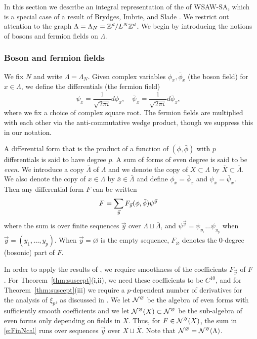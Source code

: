 In this section we describe an integral representation of the of WSAW-SA, which
is a special case of a result of Brydges, Imbrie, and Slade \cite{BIS09}.
We restrict out attention to the graph $\Lambda = \Lambda_N = { {{\mathbb Z}}^d }/L^N{ {{\mathbb Z}}^d }$.
We begin by introducing the notions of bosons and fermion fields on $\Lambda$.

\subsubsection{Boson and fermion fields}
\label{sec:forms}

We fix $N$ and write $\Lambda = \Lambda_N$.
Given complex variables $\phi_x, \bar\phi_x$
(the boson field) for $x \in \Lambda$,
we define the differentials (the fermion field)
\begin{equation}
\psi_x = \frac{1}{\sqrt{2\pi i}} d\phi_x,
\quad
\bar\psi_x = \frac{1}{\sqrt{2\pi i}} d\bar\phi_x,
\end{equation}
where we fix a choice of complex square root.
The fermion fields are multiplied with each other
via the anti-commutative wedge product,
though we suppress this in our notation.

A differential form that is the
product of a function of $(\phi, \bar\phi)$
with $p$ differentials is said to have degree $p$.
A sum of forms of even degree is said to be \emph{even}.
We introduce a copy $\bar\Lambda$ of $\Lambda$
and we denote the copy of $X \subset \Lambda$ by $\bar X \subset \bar\Lambda$.
We also denote the copy of $x \in \Lambda$
by $\bar x \in \bar\Lambda$ and define $\phi_{\bar x} = \bar\phi_x$ and $\psi_{\bar x} = \bar\psi_x$.
Then any differential form $F$ can be written
\begin{equation}
\lbeq{FinNcal}
F
=
\sum_{\vec y}
F_{\vec y} (\phi, \bar\phi)
\psi^{\vec y}
\end{equation}
where the sum is over finite sequences $\vec y$ over $\Lambda\sqcup\bar\Lambda$,
and $\psi^{\vec y} = \psi_{y_1} \ldots \psi_{y_p}$ when $\vec y = (y_1, \ldots, y_p)$.
When $\vec y = \varnothing$ is the empty sequence,
$F_\varnothing$ denotes the $0$-degree (bosonic) part of $F$.

In order to apply the results of \cite{BBS-saw4-log,BBS-saw4,BSTW-clp}, we require
smoothness of the coefficients $F_{\vec y}$ of $F$.  For Theorem~\ref{thm:suscept}(i,ii),
we need these coefficients to be $C^{10}$, and for Theorem~\ref{thm:suscept}(iii) we require
a $p$-dependent number of derivatives for the analysis of $\xi_p$, as discussed in \cite{BSTW-clp}.
We let $\mathcal{N}^\varnothing$ be the algebra of even forms with sufficiently smooth coefficients
and we let $\mathcal{N}^\varnothing(X) \subset \mathcal{N}^\varnothing$ be the sub-algebra of even forms only depending on fields
in $X$. Thus, for $F \in \mathcal{N}^\varnothing(X)$, the sum in \eqref{e:FinNcal} runs over sequences $\vec y$
over $X \sqcup \bar X$.
Note that $\mathcal{N}^\varnothing = \mathcal{N}^\varnothing(\Lambda)$.


